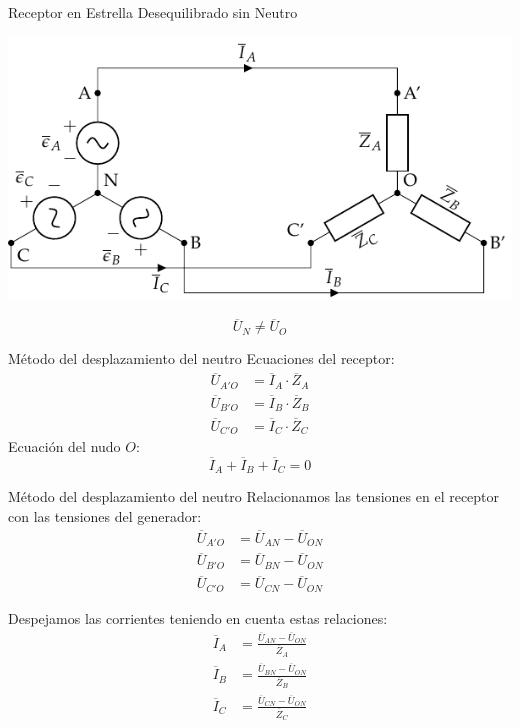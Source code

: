 \documentclass[aspectratio=169, usenames,svgnames,dvipsnames]{beamer}
\begin{document}
\begin{frame}[label={sec:orge3dd80e}]{Receptor en Estrella Desequilibrado sin Neutro}
\begin{center}
\includegraphics[height=0.7\textheight]{../figs/EstrellaDesequilibrado_SinNeutro.pdf}
\end{center}

\[
\overline{U}_N \neq \overline{U}_{O}
\]
\end{frame}

\begin{frame}[label={sec:org74ad709}]{Método del desplazamiento del neutro}
Ecuaciones del receptor:
\begin{align*}
  \overline{U}_{A'O} &= \overline{I}_A \cdot \overline{Z}_A\\
  \overline{U}_{B'O} &= \overline{I}_B \cdot \overline{Z}_B\\
  \overline{U}_{C'O} &= \overline{I}_C \cdot \overline{Z}_C
\end{align*}
Ecuación del nudo \(O\):
\[
  \overline{I}_A + \overline{I}_B + \overline{I}_C = 0
\]
\end{frame}

\begin{frame}[label={sec:org4e85775}]{Método del desplazamiento del neutro}
Relacionamos las tensiones en el receptor con las tensiones del generador:
\begin{align*}
  \overline{U}_{A'O} &= \overline{U}_{AN} - \overline{U}_{ON}\\
  \overline{U}_{B'O} &= \overline{U}_{BN} - \overline{U}_{ON}\\
  \overline{U}_{C'O} &= \overline{U}_{CN} - \overline{U}_{ON}
\end{align*}

Despejamos las corrientes teniendo en cuenta estas relaciones:
\begin{align*}
  \overline{I}_A &= \frac{\overline{U}_{AN} - \overline{U}_{ON}}{\overline{Z}_A}\\
  \overline{I}_B &= \frac{\overline{U}_{BN} - \overline{U}_{ON}}{\overline{Z}_B}\\
  \overline{I}_C &= \frac{\overline{U}_{CN} - \overline{U}_{ON}}{\overline{Z}_C}
\end{align*}
\end{frame}
\end{document}
